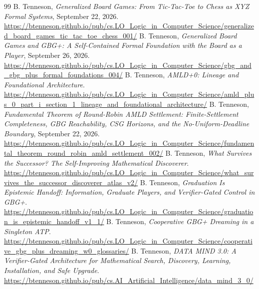 \documentclass[11pt,letterpaper]{article}
\theoremstyle{remark}
\begin{document}
\begin{thebibliography}{99}\footnotesize
{} B. Tenneson, \emph{Generalized Board Games: From Tic-Tac-Toe to Chess as XYZ Formal Systems}, September 22, 2026. \url{https://btenneson.github.io/pub/cs.LO_Logic_in_Computer_Science/generalized_board_games_tic_tac_toe_chess_001/}
 B. Tenneson, \emph{Generalized Board Games and GBG+: A Self-Contained Formal Foundation with the Board as a Player}, September 26, 2026. \url{https://btenneson.github.io/pub/cs.LO_Logic_in_Computer_Science/gbg_and_gbg_plus_formal_foundations_004/}
 B. Tenneson, \emph{AMLD+0: Lineage and Foundational Architecture}. \url{https://btenneson.github.io/pub/cs.LO_Logic_in_Computer_Science/amld_plus_0_part_i_section_1_lineage_and_foundational_architecture/}
 B. Tenneson, \emph{Fundamental Theorem of Round-Robin AMLD Settlement: Finite-Settlement Completeness, GBG Reachability, CSG Horizons, and the No-Uniform-Deadline Boundary}, September 22, 2026. \url{https://btenneson.github.io/pub/cs.LO_Logic_in_Computer_Science/fundamental_theorem_round_robin_amld_settlement_002/}
 B. Tenneson, \emph{What Survives the Successor? The Self-Improving Mathematical Discoverer}. \url{https://btenneson.github.io/pub/cs.LO_Logic_in_Computer_Science/what_survives_the_successor_discoverer_atlas_v2/}
 B. Tenneson, \emph{Graduation Is Epistemic Handoff: Information, Graduate Players, and Verifier-Gated Control in GBG+}. \url{https://btenneson.github.io/pub/cs.LO_Logic_in_Computer_Science/graduation_is_epistemic_handoff_v1_1/}
 B. Tenneson, \emph{Cooperative GBG+ Dreaming in a Singleton ATP}. \url{https://btenneson.github.io/pub/cs.LO_Logic_in_Computer_Science/cooperative_gbg_plus_dreaming_w0_glossaries/}
 B. Tenneson, \emph{DATA MIND 3.0: A Verifier-Gated Architecture for Mathematical Search, Discovery, Learning, Installation, and Safe Upgrade}. \url{https://btenneson.github.io/pub/cs.AI_Artificial_Intelligence/data_mind_3_0/}
\end{thebibliography}
\end{document}
